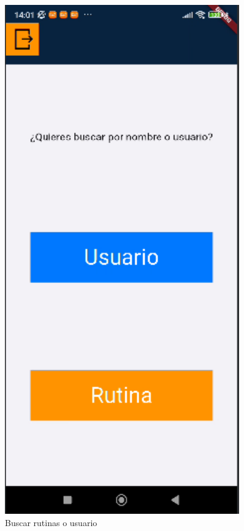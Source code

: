 \begin{figure}[H]
   \centering
   \begin{minipage}{0.45\textwidth}
      \centering
      \includegraphics[width=0.9\textwidth]{pantallas/buscarRutinasNomOUser.png}
      \caption{Buscar rutinas o usuario}
      \label{fig:buscarRutinasNomOUser}

\end{minipage}
\end{figure}
